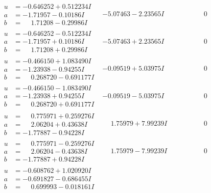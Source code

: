 \documentclass[1p]{elsarticle_modified}
\theoremstyle{definition}
\begin{document}
$$\begin{array}{c|c|c}
 \hline 
\begin{aligned}
u &= -0.646252 + 0.512234 I \\
a &= -1.71957 - 0.10186 I \\
b &= \phantom{-}1.71208 - 0.29986 I\end{aligned}
 & -5.07463 - 2.23565 I & \phantom{-0.000000 } 0 \\ \hline\begin{aligned}
u &= -0.646252 - 0.512234 I \\
a &= -1.71957 + 0.10186 I \\
b &= \phantom{-}1.71208 + 0.29986 I\end{aligned}
 & -5.07463 + 2.23565 I & \phantom{-0.000000 } 0 \\ \hline\begin{aligned}
u &= -0.466150 + 1.083490 I \\
a &= -1.23938 - 0.94255 I \\
b &= \phantom{-}0.268720 - 0.691177 I\end{aligned}
 & -0.09519 + 5.03975 I & \phantom{-0.000000 } 0 \\ \hline\begin{aligned}
u &= -0.466150 - 1.083490 I \\
a &= -1.23938 + 0.94255 I \\
b &= \phantom{-}0.268720 + 0.691177 I\end{aligned}
 & -0.09519 - 5.03975 I & \phantom{-0.000000 } 0 \\ \hline\begin{aligned}
u &= \phantom{-}0.775971 + 0.259276 I \\
a &= \phantom{-}2.06204 + 0.43638 I \\
b &= -1.77887 - 0.94228 I\end{aligned}
 & \phantom{-}1.75979 + 7.99239 I & \phantom{-0.000000 } 0 \\ \hline\begin{aligned}
u &= \phantom{-}0.775971 - 0.259276 I \\
a &= \phantom{-}2.06204 - 0.43638 I \\
b &= -1.77887 + 0.94228 I\end{aligned}
 & \phantom{-}1.75979 - 7.99239 I & \phantom{-0.000000 } 0 \\ \hline\begin{aligned}
u &= -0.608762 + 1.020920 I \\
a &= -0.691827 - 0.686455 I \\
b &= \phantom{-}0.699993 - 0.018161 I\end{aligned}

\end{array}$$
\end{document}

